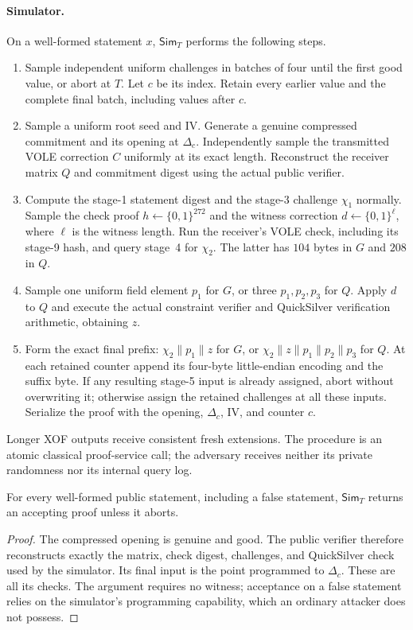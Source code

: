 \paragraph{Simulator.}
On a well-formed statement $x$, $\mathsf{Sim}_T$ performs the following steps.
\begin{enumerate}
\item Sample independent uniform challenges in batches of four until the
first good value, or abort at $T$.  Let $c$ be its index.  Retain every earlier
value and the complete final batch, including values after $c$.
\item Sample a uniform root seed and IV.  Generate a genuine compressed
commitment and its opening at $\Delta_c$.  Independently sample the transmitted
VOLE correction $C$ uniformly at its exact length.  Reconstruct the receiver
matrix $Q$ and commitment digest using the actual public verifier.
\item Compute the stage-1 statement digest and the stage-3 challenge
$\chi_1$ normally.  Sample the check proof $h\gets\{0,1\}^{272}$ and the
witness correction $d\gets\{0,1\}^{\ell}$, where $\ell$ is the witness
length.  Run the receiver's VOLE check, including its stage-9 hash, and query
stage~4 for $\chi_2$.  The latter has $104$ bytes in $G$ and $208$ in $Q$.
\item Sample one uniform field element $p_1$ for $G$, or three
$p_1,p_2,p_3$ for $Q$.  Apply $d$ to $Q$ and execute the actual constraint
verifier and QuickSilver verification arithmetic, obtaining $z$.
\item Form the exact final prefix: $\chi_2\|p_1\|z$ for $G$, or
$\chi_2\|z\|p_1\|p_2\|p_3$ for $Q$.  At each retained counter append its
four-byte little-endian encoding and the suffix byte.  If any resulting
stage-5 input is already assigned, abort without overwriting it; otherwise
assign the retained challenges at all these inputs.  Serialize the proof
with the opening, $\Delta_c$, IV, and counter $c$.
\end{enumerate}
Longer XOF outputs receive consistent fresh extensions.  The procedure is an
atomic classical proof-service call; the adversary receives neither its
private randomness nor its internal query log.

\begin{proposition}\label{prop:public-extension}
For every well-formed public statement, including a false statement,
$\mathsf{Sim}_T$ returns an accepting proof unless it aborts.
\end{proposition}
\begin{proof}
The compressed opening is genuine and good.  The public verifier therefore
reconstructs exactly the matrix, check digest, challenges, and QuickSilver
check used by the simulator.  Its final input is the point programmed to
$\Delta_c$.  These are all its checks.  The argument requires no witness;
acceptance on a false statement relies on the simulator's programming
capability, which an ordinary attacker does not possess.
\end{proof}

